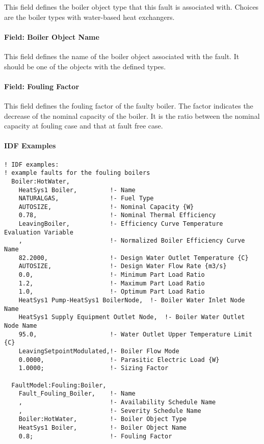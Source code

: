 This field defines the boiler object type that this fault is associated with. Choices are the boiler types with water-based heat exchangers.

\paragraph{Field: Boiler Object Name}\label{field-boiler-object-name}

This field defines the name of the boiler object associated with the fault. It should be one of the objects with the defined types.

\paragraph{Field: Fouling Factor}

This field defines the fouling factor of the faulty boiler. The factor indicates the decrease of the nominal capacity of the boiler. It is the ratio between the nominal capacity at fouling case and that at fault free case.

\paragraph{IDF Examples}

\begin{lstlisting}
! IDF examples:
! example faults for the fouling boilers
  Boiler:HotWater,
    HeatSys1 Boiler,         !- Name
    NATURALGAS,              !- Fuel Type
    AUTOSIZE,                !- Nominal Capacity {W}
    0.78,                    !- Nominal Thermal Efficiency
    LeavingBoiler,           !- Efficiency Curve Temperature Evaluation Variable
    ,                        !- Normalized Boiler Efficiency Curve Name
    82.2000,                 !- Design Water Outlet Temperature {C}
    AUTOSIZE,                !- Design Water Flow Rate {m3/s}
    0.0,                     !- Minimum Part Load Ratio
    1.2,                     !- Maximum Part Load Ratio
    1.0,                     !- Optimum Part Load Ratio
    HeatSys1 Pump-HeatSys1 BoilerNode,  !- Boiler Water Inlet Node Name
    HeatSys1 Supply Equipment Outlet Node,  !- Boiler Water Outlet Node Name
    95.0,                    !- Water Outlet Upper Temperature Limit {C}
    LeavingSetpointModulated,!- Boiler Flow Mode
    0.0000,                  !- Parasitic Electric Load {W}
    1.0000;                  !- Sizing Factor

  FaultModel:Fouling:Boiler,
    Fault_Fouling_Boiler,    !- Name
    ,                        !- Availability Schedule Name
    ,                        !- Severity Schedule Name
    Boiler:HotWater,         !- Boiler Object Type
    HeatSys1 Boiler,         !- Boiler Object Name
    0.8;                     !- Fouling Factor

\end{lstlisting}


